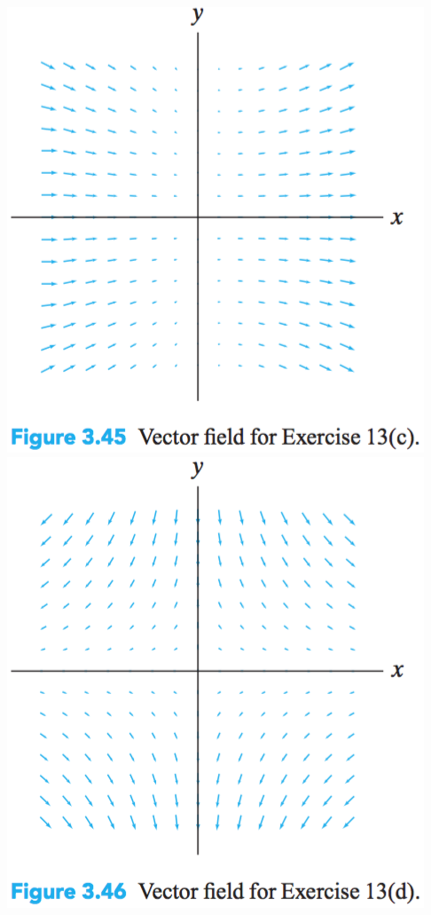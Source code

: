 \documentclass[12pt,letterpaper]{hmcpset}
\begin{document}
\begin{problem}[Colley 3.4.13]
\begin{center}
        \includegraphics[scale=0.8]{img/3_4_13c}\qquad
        \includegraphics[scale=0.8]{img/3_4_13d}
    \end{center}
\end{problem}
\begin{solution}
    \vfill
\end{solution}
\newpage
\end{document}
